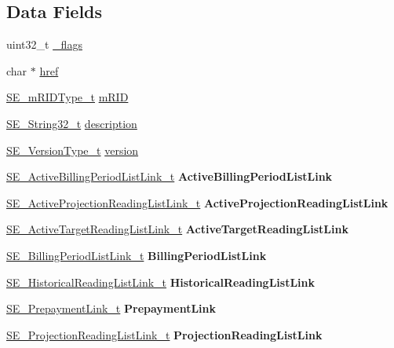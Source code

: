 \subsection*{Data Fields}
\begin{DoxyCompactItemize}
\item 
uint32\+\_\+t \hyperlink{group__CustomerAgreement_ga8ddcbc34833c692c07c506a9f7b2b8ee}{\+\_\+flags}
\item 
char $\ast$ \hyperlink{group__CustomerAgreement_ga7c63e33bcba483bdc19aa2df820459c7}{href}
\item 
\hyperlink{group__mRIDType_gac74622112f3a388a2851b2289963ba5e}{S\+E\+\_\+m\+R\+I\+D\+Type\+\_\+t} \hyperlink{group__CustomerAgreement_ga8299c1e475ea4383bd792736a412a571}{m\+R\+ID}
\item 
\hyperlink{group__String32_gac9f59b06b168b4d2e0d45ed41699af42}{S\+E\+\_\+\+String32\+\_\+t} \hyperlink{group__CustomerAgreement_gaf44dd3b2c278f39a6a43178bc50eabbd}{description}
\item 
\hyperlink{group__VersionType_ga4b8d27838226948397ed99f67d46e2ae}{S\+E\+\_\+\+Version\+Type\+\_\+t} \hyperlink{group__CustomerAgreement_ga27de1c2c7c2da3fce841f3aa2f87b9f2}{version}
\item 
\hyperlink{structSE__ActiveBillingPeriodListLink__t}{S\+E\+\_\+\+Active\+Billing\+Period\+List\+Link\+\_\+t} {\bfseries Active\+Billing\+Period\+List\+Link}
\item 
\hyperlink{structSE__ActiveProjectionReadingListLink__t}{S\+E\+\_\+\+Active\+Projection\+Reading\+List\+Link\+\_\+t} {\bfseries Active\+Projection\+Reading\+List\+Link}
\item 
\hyperlink{structSE__ActiveTargetReadingListLink__t}{S\+E\+\_\+\+Active\+Target\+Reading\+List\+Link\+\_\+t} {\bfseries Active\+Target\+Reading\+List\+Link}
\item 
\hyperlink{structSE__BillingPeriodListLink__t}{S\+E\+\_\+\+Billing\+Period\+List\+Link\+\_\+t} {\bfseries Billing\+Period\+List\+Link}
\item 
\hyperlink{structSE__HistoricalReadingListLink__t}{S\+E\+\_\+\+Historical\+Reading\+List\+Link\+\_\+t} {\bfseries Historical\+Reading\+List\+Link}
\item 
\hyperlink{structSE__PrepaymentLink__t}{S\+E\+\_\+\+Prepayment\+Link\+\_\+t} {\bfseries Prepayment\+Link}
\item 
\hyperlink{structSE__ProjectionReadingListLink__t}{S\+E\+\_\+\+Projection\+Reading\+List\+Link\+\_\+t} {\bfseries Projection\+Reading\+List\+Link}
\item 

\end{DoxyCompactItemize}

